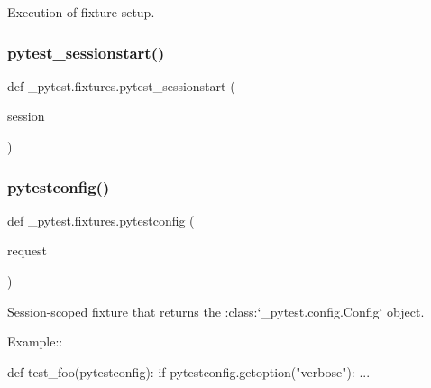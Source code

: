 \begin{DoxyVerb}Execution of fixture setup. \end{DoxyVerb}
 \mbox{\label{namespace__pytest_1_1fixtures_a995865f09bb645c7a5bcfdcb11e2c154}} 
\subsubsection{\texorpdfstring{pytest\+\_\+sessionstart()}{pytest\_sessionstart()}}
{\footnotesize\ttfamily def \+\_\+pytest.\+fixtures.\+pytest\+\_\+sessionstart (\begin{DoxyParamCaption}\item[{}]{session }\end{DoxyParamCaption})}

\mbox{\label{namespace__pytest_1_1fixtures_a711059d3b8fdee306cc7126243cf9528}} 
\subsubsection{\texorpdfstring{pytestconfig()}{pytestconfig()}}
{\footnotesize\ttfamily def \+\_\+pytest.\+fixtures.\+pytestconfig (\begin{DoxyParamCaption}\item[{}]{request }\end{DoxyParamCaption})}

\begin{DoxyVerb}Session-scoped fixture that returns the :class:`_pytest.config.Config` object.

Example::

    def test_foo(pytestconfig):
        if pytestconfig.getoption("verbose"):
            ...\end{DoxyVerb}
 \mbox{\label{namespace__pytest_1_1fixtures_abc92ba4fd6b080bb8f11cbcef4aeafe0}} 
